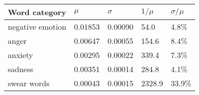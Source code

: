\begin{tabular}{lllll}
\toprule
Word category &    $\mu$ & $\sigma$ & $1/\mu$ & $\sigma / \mu$ \\
\midrule
negative emotion &  0.01853 &  0.00090 &    54.0 &          4.8\% \\
anger            &  0.00647 &  0.00055 &   154.6 &          8.4\% \\
anxiety          &  0.00295 &  0.00022 &   339.4 &          7.3\% \\
sadness          &  0.00351 &  0.00014 &   284.8 &          4.1\% \\
swear words      &  0.00043 &  0.00015 &  2328.9 &         33.9\% \\
\bottomrule
\end{tabular}
